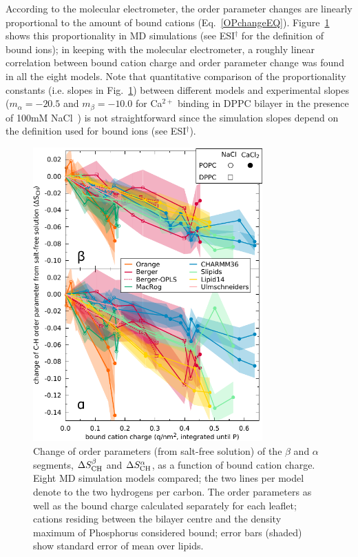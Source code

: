 \documentclass[twoside,twocolumn,9pt]{article}
\begin{document}
According to the molecular electrometer, the order parameter changes are linearly proportional to
the amount of bound cations (Eq.~\eqref{OPchangeEQ}).
Figure~\ref{electrometer} shows this proportionality in MD simulations
(see ESI$^\dag$ for the definition of bound ions);
in keeping with the molecular electrometer, a roughly linear correlation between bound cation charge and order parameter change was found in all the eight models.
Note that quantitative comparison of the proportionality constants (i.e. slopes in Fig.~\ref{electrometer})
between different models and experimental slopes
($m_\alpha=-20.5$ and $m_\beta=-10.0$ for Ca$^{2+}$ binding in DPPC bilayer in
the presence of 100mM NaCl~\cite{altenbach84}) is not straightforward 
since the simulation slopes depend on the definition used for bound ions (see ESI$^\dag$).
\begin{figure}[t]
  \centering
  \includegraphics[width=8.8cm]{../Fig/dOP_vs_boundCationCharge_P.pdf}
  \caption{\label{electrometer}
    Change of order parameters (from salt-free solution) of the $\beta$ and $\alpha$ segments,
    $\Delta S_{\rm{CH}}^{\beta}$ and $\Delta S_{\rm{CH}}^{\alpha}$,
    as a function of bound cation charge.
    Eight MD simulation models compared; the two lines per model denote to the two hydrogens per carbon.
    The order parameters as well as the bound charge calculated separately for
    each leaflet; cations residing between the bilayer centre and the density maximum of Phosphorus
    considered bound; error bars (shaded) show standard error of mean over lipids.
   }
\end{figure}
\end{document}
